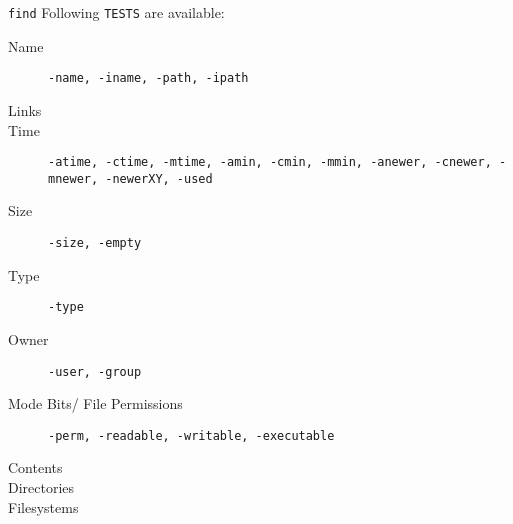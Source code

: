 \documentclass[11pt]{beamer}
\begin{document}
			\begin{frame}{ \texttt{find}}
				Following \texttt{TESTS} are available:
				\begin{description}
					\item[Name] \texttt{-name, -iname, -path, -ipath}
					\item[Links]
					\item[Time] \texttt{-atime, -ctime, -mtime, -amin, -cmin, -mmin, -anewer, -cnewer, -mnewer, -newerXY, -used}
					\item[Size] \texttt{-size, -empty}
					\item[Type] \texttt{-type}
					\item[Owner] \texttt{-user, -group}
					\item[Mode Bits/ File Permissions] \texttt{-perm, -readable, -writable, -executable}
					\item[Contents]
					\item[Directories]
					\item[Filesystems]
				\end{description}
			\end{frame}
\end{document}
